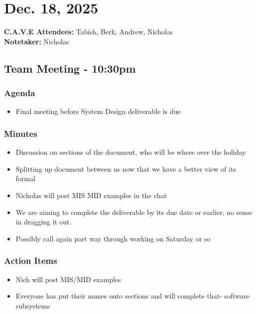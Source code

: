 	\pagebreak
	\section*{Dec. 18, 2025}

	\textbf{C.A.V.E Attendees:} Tabish, Berk, Andrew, Nicholas\\
	\textbf{Notetaker:} Nicholas

	\subsection*{Team Meeting - 10:30pm}
		\subsubsection*{Agenda}
			\begin{itemize}
				\item Final meeting before System Design deliverable is due
			\end{itemize}

		\subsubsection*{Minutes}
			\begin{itemize}
				\item Discussion on sections of the document, who will be where over the holiday
				\item Splitting up document between us now that we have a better view of its formal
				\item Nicholas will post MIS MID examples in the chat 
				\item We are aiming to complete the deliverable by its due date or earlier, no sense in dragging it out.
				\item Possibly call again part way through working on Saturday or so
			\end{itemize}

		\subsubsection*{Action Items}
			\begin{itemize}
				\item Nich will post MIS/MID examples
				\item Everyone has put their names onto sections and will complete that- software subsystems 
			\end{itemize}


